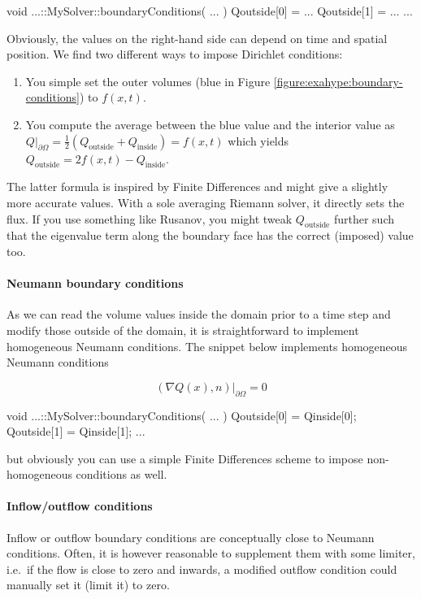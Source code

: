 \begin{code}
void ...::MySolver::boundaryConditions(
  ...
) {
  Qoutside[0] = ...
  Qoutside[1] = ...
  ...
}
\end{code}

\noindent
Obviously, the values on the right-hand side can depend on time and spatial
position.
We find two different ways to impose Dirichlet conditions:
\begin{enumerate}
  \item You simple set the outer volumes (blue in Figure
\ref{figure:exahype:boundary-conditions}) to $f(x,t)$.
  \item You compute the average between the blue value and the interior value as
  $Q | _{\partial \Omega } = \frac{1}{2} (Q_{\text{outside}} +
  Q_{\text{inside}}) = f(x,t)$ which yields $Q_{\text{outside}} =
  2f(x,t)-Q_{\text{inside}}$.
\end{enumerate}

\noindent
The latter formula is inspired by Finite Differences and might give a slightly
more accurate values.
With a sole averaging Riemann solver, it directly sets the flux.
If you use something like Rusanov, you might tweak $Q_{\text{outside}}$ further
such that the eigenvalue term along the boundary face has the correct
(imposed) value too.


\paragraph{Neumann boundary conditions}
%
%
%
As we can read the volume values inside the domain prior to a time step
and modify those outside of the domain, it is straightforward to implement
homogeneous Neumann conditions.
The snippet below implements homogeneous Neumann conditions

\[
  \left( \nabla Q(x), n \right)  | _{\partial \Omega } = 0
\]


\begin{code}
void ...::MySolver::boundaryConditions(
  ...
) {
  Qoutside[0] = Qinside[0];
  Qoutside[1] = Qinside[1];
  ...
}
\end{code}

\noindent
but obviously you can use a simple Finite Differences scheme to impose
non-homogeneous conditions as well.



\paragraph{Inflow/outflow conditions}
%
%
%
Inflow or outflow boundary conditions are conceptually close to Neumann
conditions. 
Often, it is however reasonable to supplement them with some limiter, i.e.~if
the flow is close to zero and inwards, a modified outflow condition could
manually set it (limit it) to zero.


